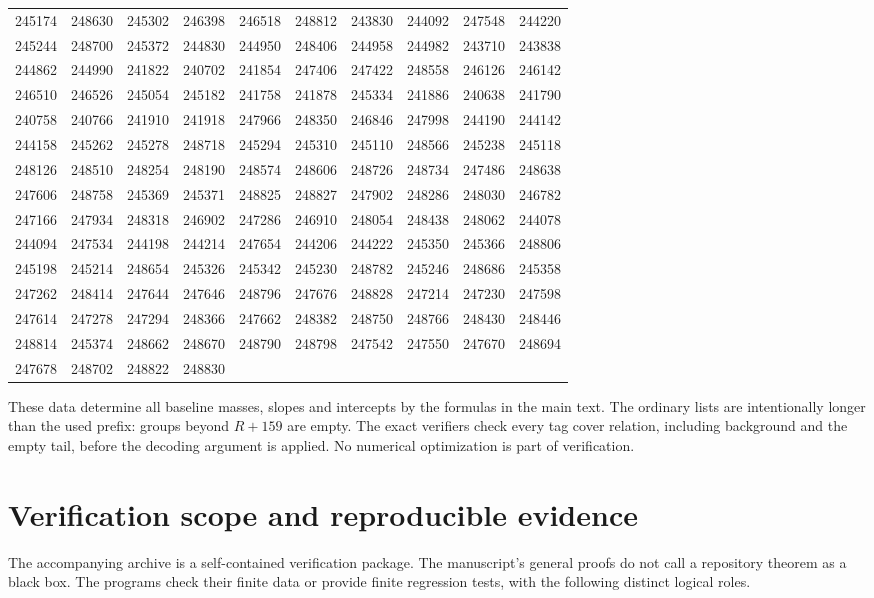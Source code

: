 \documentclass[11pt]{article}
\numberwithin{equation}{section}
\theoremstyle{definition}
\theoremstyle{remark}
\begin{document}
{\begin{longtable}{rrrrrrrrrr}
245174 & 248630 & 245302 & 246398 & 246518 & 248812 & 243830 & 244092 & 247548 & 244220\\
245244 & 248700 & 245372 & 244830 & 244950 & 248406 & 244958 & 244982 & 243710 & 243838\\
244862 & 244990 & 241822 & 240702 & 241854 & 247406 & 247422 & 248558 & 246126 & 246142\\
246510 & 246526 & 245054 & 245182 & 241758 & 241878 & 245334 & 241886 & 240638 & 241790\\
240758 & 240766 & 241910 & 241918 & 247966 & 248350 & 246846 & 247998 & 244190 & 244142\\
244158 & 245262 & 245278 & 248718 & 245294 & 245310 & 245110 & 248566 & 245238 & 245118\\
248126 & 248510 & 248254 & 248190 & 248574 & 248606 & 248726 & 248734 & 247486 & 248638\\
247606 & 248758 & 245369 & 245371 & 248825 & 248827 & 247902 & 248286 & 248030 & 246782\\
247166 & 247934 & 248318 & 246902 & 247286 & 246910 & 248054 & 248438 & 248062 & 244078\\
244094 & 247534 & 244198 & 244214 & 247654 & 244206 & 244222 & 245350 & 245366 & 248806\\
245198 & 245214 & 248654 & 245326 & 245342 & 245230 & 248782 & 245246 & 248686 & 245358\\
247262 & 248414 & 247644 & 247646 & 248796 & 247676 & 248828 & 247214 & 247230 & 247598\\
247614 & 247278 & 247294 & 248366 & 247662 & 248382 & 248750 & 248766 & 248430 & 248446\\
248814 & 245374 & 248662 & 248670 & 248790 & 248798 & 247542 & 247550 & 247670 & 248694\\
247678 & 248702 & 248822 & 248830 & & & & & &\\
\end{longtable}}

These data determine all baseline masses, slopes and intercepts by the
formulas in the main text. The ordinary lists are intentionally longer than
the used prefix: groups beyond $R+159$ are empty. The exact verifiers check
every tag cover relation, including background and the empty tail, before
the decoding argument is applied. No numerical optimization is part of
verification.



\section{Verification scope and reproducible evidence}\label{v2:app:verification}
The accompanying archive is a self-contained verification package. The
manuscript's general proofs do not call a repository theorem as a black box.
The programs check their finite data or provide finite regression tests,
with the following distinct logical roles.
\end{document}
